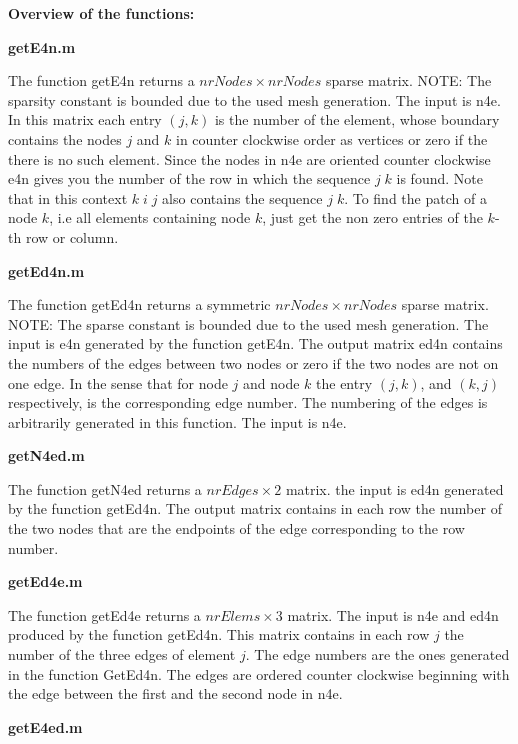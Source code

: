 {\bf \large Overview of the functions:}\bigskip


{\bf \large getE4n.m}\medskip

The function getE4n returns a $nrNodes \times nrNodes$ sparse matrix. NOTE:
The sparsity constant is bounded due to the used mesh generation. The
input is n4e. In this matrix each entry $(j,k)$ is the number of the
element, whose boundary contains the nodes $j$ and $k$ in
counter clockwise order as vertices or zero if the there is no such
element. Since the nodes in n4e are oriented counter clockwise e4n
gives you the number of the row in which the sequence $j\;k$ is found. Note that 
in this context $k\;i\;j$ also contains the sequence $j\;k$. To find the patch of a node $k$, i.e all
elements containing node $k$, just get the non zero entries of the $k$-th row or column.\\ \medskip

{\bf \large getEd4n.m}\medskip

The function getEd4n returns a symmetric $nrNodes \times nrNodes$
sparse matrix. NOTE: The sparse constant is bounded due to the used mesh generation.
 The input is e4n generated by the function getE4n. The
output matrix ed4n contains the numbers of the edges between two
nodes or zero if the two nodes are not on one edge. In the sense
that for node $j$ and node $k$ the entry $(j,k)$, and $(k,j)$ respectively,
is the corresponding edge number. The numbering of the edges is
arbitrarily generated in this function. The input is n4e.\\ \medskip

{\bf \large getN4ed.m}\medskip

The function getN4ed returns a $nrEdges \times 2$ matrix. the input is
ed4n generated by the function getEd4n. The output matrix contains
in each row the number of the two nodes that are the endpoints of
the edge corresponding to the row number.\\ \medskip

{\bf \large getEd4e.m}\medskip

The function getEd4e returns a $nrElems \times 3$ matrix. The input is n4e
and ed4n produced by the function getEd4n. This matrix contains in
each row $j$ the number of the three edges of element $j$. The edge
numbers are the ones generated  in the function GetEd4n. The edges
are ordered counter clockwise beginning with the edge between the
first and the second node in n4e.\\ \medskip

{\bf \large getE4ed.m}\medskip

